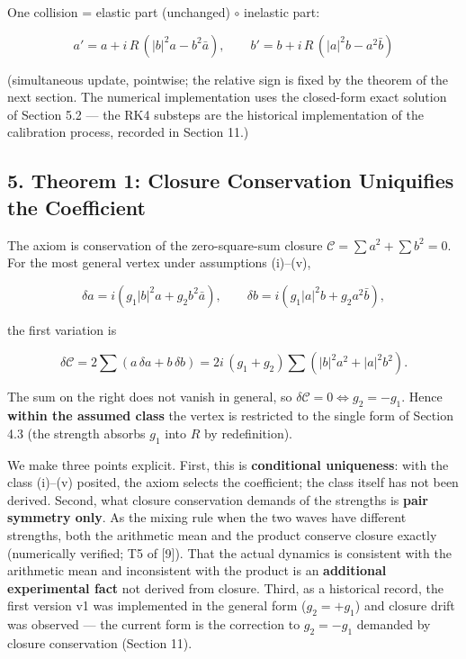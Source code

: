 \documentclass[
  a4paper,
]{article}
\begin{document}
One collision = elastic part (unchanged) \(\circ\) inelastic part:

\[a' = a + i\,R\,(|b|^2 a - b^2 \bar a), \qquad b' = b + i\,R\,(|a|^2 b - a^2 \bar b)\]

(simultaneous update, pointwise; the relative sign is fixed by the
theorem of the next section. The numerical implementation uses the
closed-form exact solution of Section 5.2 --- the RK4 substeps are the
historical implementation of the calibration process, recorded in
Section 11.)

\subsection{5. Theorem 1: Closure Conservation Uniquifies the
Coefficient}\label{theorem-1-closure-conservation-uniquifies-the-coefficient}

The axiom is conservation of the zero-square-sum closure
\(\mathcal{C} = \sum a^2 + \sum b^2 = 0\). For the most general vertex
under assumptions (i)--(v),

\[\delta a = i(g_1 |b|^2 a + g_2 b^2 \bar a), \qquad \delta b = i(g_1 |a|^2 b + g_2 a^2 \bar b),\]

the first variation is

\[\delta \mathcal{C} = 2\sum (a\,\delta a + b\,\delta b) = 2i\,(g_1+g_2)\sum\left(|b|^2 a^2 + |a|^2 b^2\right).\]

The sum on the right does not vanish in general, so
\(\delta\mathcal{C}=0 \iff g_2 = -g_1\). Hence \textbf{within the
assumed class} the vertex is restricted to the single form of Section
4.3 (the strength absorbs \(g_1\) into \(R\) by redefinition).

We make three points explicit. First, this is \textbf{conditional
uniqueness}: with the class (i)--(v) posited, the axiom selects the
coefficient; the class itself has not been derived. Second, what closure
conservation demands of the strengths is \textbf{pair symmetry only}. As
the mixing rule when the two waves have different strengths, both the
arithmetic mean and the product conserve closure exactly (numerically
verified; T5 of {[}9{]}). That the actual dynamics is consistent with
the arithmetic mean and inconsistent with the product is an
\textbf{additional experimental fact} not derived from closure. Third,
as a historical record, the first version v1 was implemented in the
general form (\(g_2=+g_1\)) and closure drift was observed --- the
current form is the correction to \(g_2=-g_1\) demanded by closure
conservation (Section 11).
\end{document}
